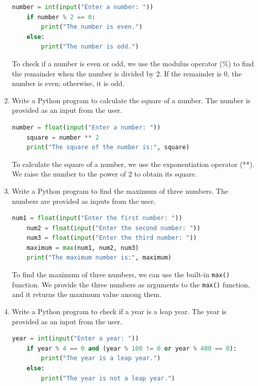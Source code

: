 \documentclass[12pt]{book}
\begin{document}
\begin{enumerate}
    \begin{lstlisting}[language=Python]
    number = int(input("Enter a number: "))
    if number % 2 == 0:
        print("The number is even.")
    else:
        print("The number is odd.")
    \end{lstlisting}

    To check if a number is even or odd, we use the modulus operator (\%) to find the remainder when the number is divided by 2. If the remainder is 0, the number is even; otherwise, it is odd.

    \item Write a Python program to calculate the square of a number. The number is provided as an input from the user.

    \begin{lstlisting}[language=Python]
    number = float(input("Enter a number: "))
    square = number ** 2
    print("The square of the number is:", square)
    \end{lstlisting}

    To calculate the square of a number, we use the exponentiation operator (**). We raise the number to the power of 2 to obtain its square.

    \item Write a Python program to find the maximum of three numbers. The numbers are provided as inputs from the user.

    \begin{lstlisting}[language=Python]
    num1 = float(input("Enter the first number: "))
    num2 = float(input("Enter the second number: "))
    num3 = float(input("Enter the third number: "))
    maximum = max(num1, num2, num3)
    print("The maximum number is:", maximum)
    \end{lstlisting}

    To find the maximum of three numbers, we can use the built-in \texttt{max()} function. We provide the three numbers as arguments to the \texttt{max()} function, and it returns the maximum value among them.

    \item Write a Python program to check if a year is a leap year. The year is provided as an input from the user.

    \begin{lstlisting}[language=Python]
    year = int(input("Enter a year: "))
    if year % 4 == 0 and (year % 100 != 0 or year % 400 == 0):
        print("The year is a leap year.")
    else:
        print("The year is not a leap year.")
    \end{lstlisting}


\end{enumerate}
\end{document}

